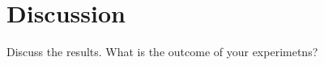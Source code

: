 \section{Discussion}\label{chap:discussion}


Discuss the results. What is the outcome of your experimetns?